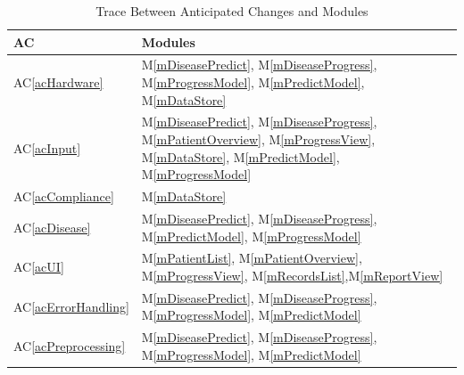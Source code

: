 \documentclass[12pt, titlepage]{article}
\newcommand{\acref}[1]{AC\ref{#1}}
\newcommand{\mref}[1]{M\ref{#1}}
\begin{document}
\begin{table}[H]
\centering
\begin{tabular}{p{} p{}}
\toprule
\textbf{AC} & \textbf{Modules}\\
\midrule
\acref{acHardware} & \mref{mDiseasePredict}, \mref{mDiseaseProgress}, \mref{mProgressModel}, \mref{mPredictModel}, \mref{mDataStore}\\
\acref{acInput} & \mref{mDiseasePredict}, \mref{mDiseaseProgress}, \mref{mPatientOverview}, \mref{mProgressView}, \mref{mDataStore}, \mref{mPredictModel}, \mref{mProgressModel}\\
\acref{acCompliance} & \mref{mDataStore}\\
\acref{acDisease} & \mref{mDiseasePredict}, \mref{mDiseaseProgress}, \mref{mPredictModel}, \mref{mProgressModel}\\
\acref{acUI} & \mref{mPatientList}, \mref{mPatientOverview}, \mref{mProgressView}, \mref{mRecordsList},\mref{mReportView}\\
\acref{acErrorHandling} & \mref{mDiseasePredict}, \mref{mDiseaseProgress}, \mref{mProgressModel}, \mref{mPredictModel}\\
\acref{acPreprocessing} & \mref{mDiseasePredict}, \mref{mDiseaseProgress}, \mref{mProgressModel}, \mref{mPredictModel}\\
\bottomrule
\end{tabular}
\caption{Trace Between Anticipated Changes and Modules}
\label{TblACT}
\end{table}
\end{document}
